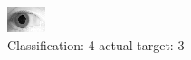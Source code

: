 \begin{figure}[h!]
\begin{center}
\includegraphics[width=0.60\columnwidth]{figures/ID1860_class_4_target_3.png}
\end{center}
\caption{ Classification: 4 actual target: 3}
\label{fig:ID1860_class_4_target_3}
\end{figure}
